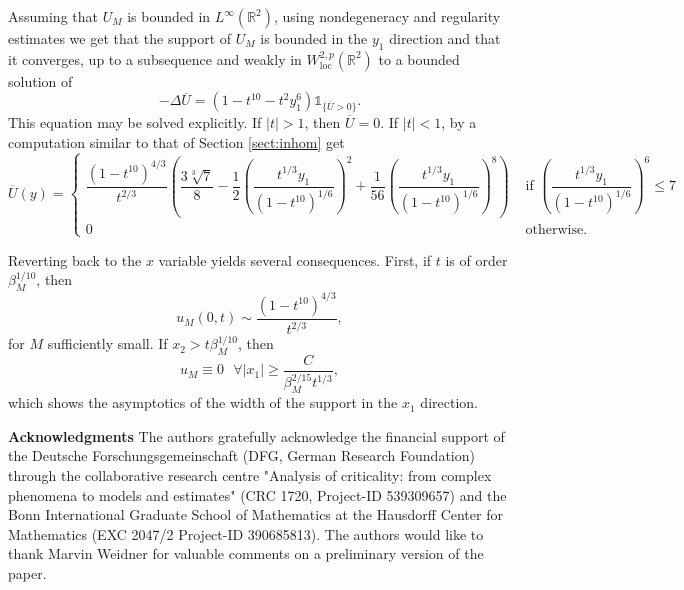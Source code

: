 \documentclass[10pt,a4paper]{article}
\newcommand{\loc}{\mathrm{loc}}
\newcommand{\RR}{\mathbb{R}}
\newcommand{\faskip}{\hspace{8pt}}
\numberwithin{equation}{section}
\begin{document}
Assuming that $ U_M $ is bounded in $ L^{\infty}(\RR^{2}) $, using nondegeneracy and regularity estimates we get that the support of $ U_M $ is bounded in the $ y_1 $ direction and that it converges, up to a subsequence and weakly in $ W^{2,p}_{\loc}(\RR^{2}) $ to a bounded solution of
\[-\Delta \overline{U} = \left( 1- t^{10} - t^2 y_1^6 \right) \mathbb{1}_{\{\overline{U} > 0\}}.\]
This equation may be solved explicitly. If $|t| > 1$, then $\overline{U} = 0$. If $|t| < 1$, by a computation similar to that of Section \ref{sect:inhom} get
\[
\overline{U}(y) =
\begin{cases}
\dfrac{(1-t^{10})^{4/3}}{t^{2/3}} \left( \dfrac{3 \sqrt[3]{7}}{8}- \dfrac12 \left( \dfrac{t^{1/3}y_1}{(1-t^{10})^{1/6}}\right)^2 + \dfrac{1}{56}\left( \dfrac{t^{1/3}y_1}{(1-t^{10})^{1/6}}\right)^8\right) & \text{ if }	\left( \dfrac{t^{1/3}y_1}{(1-t^{10})^{1/6}}\right)^6 \leq 7 \\
0  &\text{ otherwise}.
\end{cases}
\]

Reverting back to the $x$ variable yields several consequences. First, if $t$ is of order $\beta_M^{1/10}$, then
\[ u_M(0,t) \sim \frac{(1-t^{10})^{4/3}}{t^{2/3}},\]
for $M$ sufficiently small. If $x_2 > t \beta_M^{1/10}$, then
\[u_M \equiv 0 \faskip \forall |x_1| \geq \frac{C}{\beta_M^{2/15}t^{1/3}}, \]
which shows the asymptotics of the width of the support in the $x_1$ direction.

\textbf{Acknowledgments} The authors gratefully acknowledge the financial support of the Deutsche Forschungsgemeinschaft (DFG, German Research Foundation) through the collaborative research centre "Analysis of criticality: from complex phenomena to models and estimates" (CRC 1720, Project-ID 539309657) and the Bonn International Graduate School of Mathematics at the Hausdorff Center for Mathematics (EXC 2047/2 Project-ID 390685813). The authors would like to thank Marvin Weidner for valuable comments on a preliminary version of the paper.

\printbibliography
\end{document}
